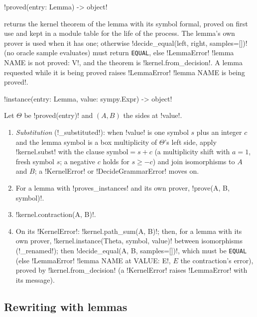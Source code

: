\begin{signature}
\py!proved(entry: Lemma) -> object!
\end{signature}
returns the kernel theorem of the lemma with its symbol formal, proved on first use and kept in a module table for the life of the process. The lemma's own prover is used when it has one; otherwise \py!decide_equal(left, right, samples=[])! (no oracle sample evaluates) must return \texttt{EQUAL}, else \py!LemmaError! \code!lemma NAME is not proved: V!, and the theorem is \py!kernel.from_decision!. A lemma requested while it is being proved raises \py!LemmaError! \code!lemma NAME is being proved!.

\begin{signature}
\py!instance(entry: Lemma, value: sympy.Expr) -> object!
\end{signature}

\begin{algorithm}\label{alg:proofs-lemma-instance}
Let $\Theta$ be \py!proved(entry)! and $(A,B)$ the sides at \py!value!.
\begin{enumerate}
\item \emph{Substitution} (\py!_substituted!): when \py!value! is one symbol $s$ plus an integer $c$ and the lemma symbol is a box multiplicity of $\Theta$'s left side, apply \py!kernel.subst! with the clause $\text{symbol}=s+c$ (a multiplicity shift with $a=1$, fresh symbol $s$; a negative $c$ holds for $s\ge-c$) and join isomorphisms to $A$ and $B$; a \py!KernelError! or \py!DecideGrammarError! moves on.
\item For a lemma with \py!proves_instances! and its own prover, \py!prove(A, B, symbol)!.
\item \py!kernel.contraction(A, B)!.
\item On its \py!KernelError!: \py!kernel.path_sum(A, B)!; then, for a lemma with its own prover, \py!kernel.instance(Theta, symbol, value)! between isomorphisms (\py!_renamed!); then \py!decide_equal(A, B, samples=[])!, which must be \texttt{EQUAL} (else \py!LemmaError! \code!lemma NAME at VALUE: E!, $E$ the contraction's error), proved by \py!kernel.from_decision! (a \py!KernelError! raises \py!LemmaError! with its message).
\end{enumerate}
\end{algorithm}

\subsection{Rewriting with lemmas}

